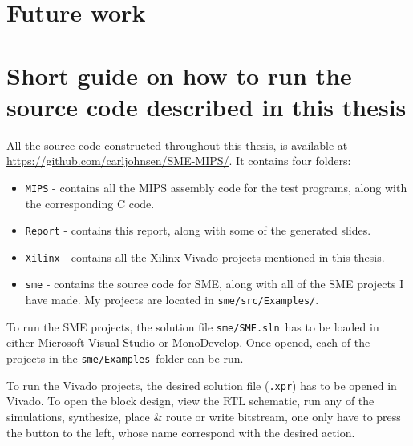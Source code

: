 \documentclass[a4paper]{article}
\begin{document}
\section{Future work}


\newpage
%

{\small}

\appendix
\section{Short guide on how to run the source code described in this thesis}
All the source code constructed throughout this thesis, is available at
\url{https://github.com/carljohnsen/SME-MIPS/}. It contains four folders:
\begin{itemize}
    \item \texttt{MIPS} - contains all the MIPS assembly code for the test
        programs, along with the corresponding C code.

    \item \texttt{Report} - contains this report, along with some of the
        generated slides.

    \item \texttt{Xilinx} - contains all the Xilinx Vivado projects mentioned
        in this thesis.

    \item \texttt{sme} - contains the source code for SME, along with all of
        the SME projects I have made. My projects are located in
        \texttt{sme/src/Examples/}.
\end{itemize}
To run the SME projects, the solution file \texttt{sme/SME.sln} has to be
loaded in either Microsoft Visual Studio or MonoDevelop. Once opened, each of
the projects in the \texttt{sme/Examples} folder can be run.

To run the Vivado projects, the desired solution file (\texttt{.xpr}) has to be
opened in Vivado. To open the block design, view the RTL schematic, run any of
the simulations, synthesize, place \& route or write bitstream, one only have
to press the button to the left, whose name correspond with the desired action.
\end{document}
